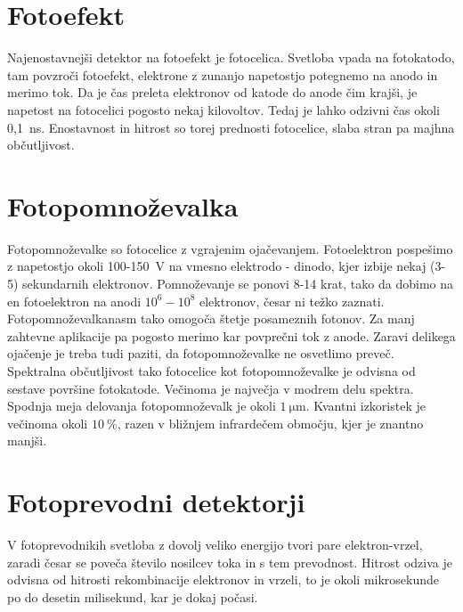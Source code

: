 \section{Fotoefekt}

Najenostavnejši detektor na fotoefekt je fotocelica. Svetloba vpada na fotokatodo, tam povzroči
fotoefekt, elektrone z zunanjo napetostjo potegnemo na anodo in merimo tok. Da je čas preleta
elektronov od katode do anode čim krajši, je napetost na fotocelici pogosto nekaj kilovoltov.
Tedaj je lahko odzivni čas okoli 0,1~ns. Enostavnost in hitrost so torej prednosti fotocelice, slaba
stran pa majhna občutljivost.

\section{Fotopomnoževalka}
Fotopomnoževalke so fotocelice z vgrajenim ojačevanjem. Fotoelektron pospešimo z napetostjo
okoli 100-150~V na vmesno elektrodo - dinodo, kjer izbije nekaj (3-5) sekundarnih elektronov. 
Pomnoževanje se ponovi 8-14 krat, tako da dobimo na en fotoelektron na anodi $10^6 - 10^8$ 
elektronov, česar ni težko zaznati. Fotopomnoževalkanasm tako omogoča štetje posameznih fotonov.
Za manj zahtevne aplikacije pa pogosto merimo kar povprečni tok z anode. Zaravi delikega ojačenje
je treba tudi paziti, da fotopomnoževalke ne osvetlimo preveč. Spektralna občutljivost
tako fotocelice kot fotopomnoževalke je odvisna od sestave površine fotokatode. Večinoma
je največja v modrem delu spektra. Spodnja meja delovanja fotopomnoževalk je okoli $1~\si{\micro\metre}$.
Kvantni izkoristek je večinoma okoli $10~\%$, razen v bližnjem infrardečem območju, kjer
je znantno manjši. 

\section{Fotoprevodni detektorji}
V fotoprevodnikih svetloba z dovolj veliko energijo tvori pare elektron-vrzel, zaradi  česar
se poveča število nosilcev toka in s tem prevodnost. Hitrost odziva je odvisna od hitrosti
rekombinacije elektronov in vrzeli, to je okoli mikrosekunde po do desetin milisekund, kar
je dokaj počasi. 

